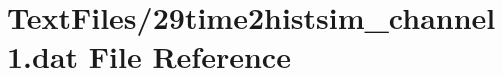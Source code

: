 \hypertarget{29time2histsim__channel1_8dat}{}\section{Text\+Files/29time2histsim\+\_\+channel1.dat File Reference}
\label{29time2histsim__channel1_8dat}
